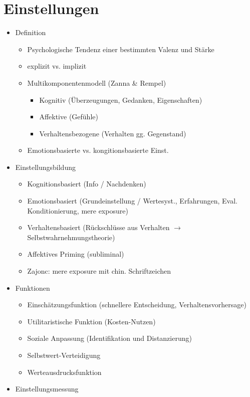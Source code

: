 \documentclass[11pt, paper=a4, twocolumn]{scrartcl}
\begin{document}
	\section{Einstellungen}
		\begin{itemize}
			\item Definition
				\begin{itemize}
					\item Psychologische Tendenz einer bestimmten Valenz und Stärke
					\item explizit vs. implizit
					\item Multikomponentenmodell (Zanna \& Rempel)
						\begin{itemize}
							\item Kognitiv (Überzeugungen, Gedanken, Eigenschaften)
							\item Affektive (Gefühle)
							\item Verhaltensbezogene (Verhalten gg. Gegenstand)
						\end{itemize}
					\item Emotionsbasierte vs. kongitionsbasierte Einst.
				\end{itemize}
			\item Einstellungsbildung
				\begin{itemize}
					\item Kognitionsbasiert (Info / Nachdenken)
					\item Emotionsbasiert (Grundeinstellung / Wertesyst., Erfahrungen, Eval. Konditionierung, mere exposure)
					\item Verhaltensbasiert (Rückschlüsse aus Verhalten $\rightarrow$ Selbstwahrnehmungstheorie)
					\item Affektives Priming (subliminal)
					\item Zajonc: mere exposure mit chin. Schriftzeichen
				\end{itemize}
			\item Funktionen
				\begin{itemize}
					\item Einschätzungsfunktion (schnellere Entscheidung, Verhaltensvorhersage)
					\item Utilitaristische Funktion (Kosten-Nutzen)
					\item Soziale Anpassung (Identifikation und Distanzierung)
					\item Selbstwert-Verteidigung
					\item Werteausdrucksfunktion
				\end{itemize}
			\item Einstellungsmessung

\end{itemize}
\end{document}
